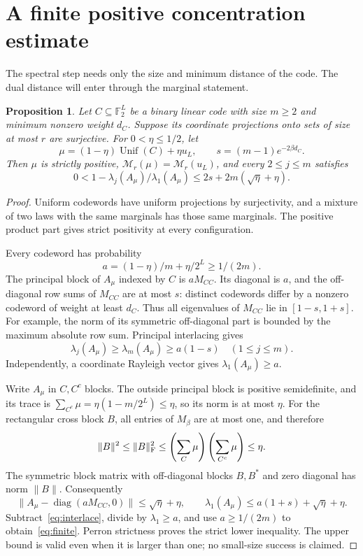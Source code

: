\documentclass[11pt]{article}
\newtheorem{proposition}[theorem]{Proposition}
\newcommand{\F}{\mathbb F}
\newcommand{\diag}{\operatorname{diag}}
\newcommand{\Unif}{\operatorname{Unif}}
\begin{document}
\section{A finite positive concentration estimate}
The spectral step needs only the size and minimum distance of the code.
The dual distance will enter through the marginal statement.

\begin{proposition}\label{prop:finite}
Let $C\subseteq\F_2^L$ be a binary linear code with size $m\ge2$ and
minimum nonzero weight $d_C$. Suppose its coordinate projections onto
sets of size at most $r$ are surjective. For $0<\eta\le1/2$, let
\begin{equation}\label{eq:mixture}
 \mu=(1-\eta)\Unif(C)+\eta u_L,
 \qquad s=(m-1)e^{-2\beta d_C}.
\end{equation}
Then $\mu$ is strictly positive, $\mathcal M_r(\mu)=\mathcal M_r(u_L)$,
and every $2\le j\le m$ satisfies
\begin{equation}\label{eq:finite}
 0<1-\lambda_j(A_\mu)/\lambda_1(A_\mu)
       \le 2s+2m(\sqrt\eta+\eta).
\end{equation}
\end{proposition}
\begin{proof}
Uniform codewords have uniform projections by surjectivity, and a mixture
of two laws with the same marginals has those same marginals. The positive
product part gives strict positivity at every configuration.

Every codeword has probability
\[
 a=(1-\eta)/m+\eta/2^L\ge1/(2m).
\]
The principal block of $A_\mu$ indexed by $C$ is $aM_{CC}$. Its diagonal
is $a$, and the off-diagonal row sums of $M_{CC}$ are at most $s$:
distinct codewords differ by a nonzero codeword of weight at least $d_C$.
Thus all eigenvalues of $M_{CC}$ lie in $[1-s,1+s]$. For example, the
norm of its symmetric off-diagonal part is bounded by the maximum
absolute row sum. Principal interlacing gives
\begin{equation}\label{eq:interlace}
 \lambda_j(A_\mu)\ge\lambda_m(A_\mu)\ge a(1-s)
       \quad(1\le j\le m).
\end{equation}
Independently, a coordinate Rayleigh vector gives $\lambda_1(A_\mu)\ge a$.

Write $A_\mu$ in $C,C^c$ blocks. The outside principal block is positive
semidefinite, and its trace is
$\sum_{C^c}\mu=\eta(1-m/2^L)\le\eta$, so its norm is at most $\eta$.
For the rectangular cross block $B$, all entries of $M_\beta$ are at most
one, and therefore
\[
 \|B\|^2\le\|B\|_{\rm F}^2
 \le\left(\sum_C\mu\right)\left(\sum_{C^c}\mu\right)\le\eta.
\]
The symmetric block matrix with off-diagonal blocks $B,B^*$ and zero
diagonal has norm $\|B\|$. Consequently
\[
 \bigl\|A_\mu-\diag(aM_{CC},0)\bigr\|\le\sqrt\eta+\eta,
 \qquad
 \lambda_1(A_\mu)\le a(1+s)+\sqrt\eta+\eta.
\]
Subtract~\eqref{eq:interlace}, divide by $\lambda_1\ge a$, and use
$a\ge1/(2m)$ to obtain~\eqref{eq:finite}. Perron strictness proves the
strict lower inequality. The upper bound is valid even when it is
larger than one; no small-size success is claimed.
\end{proof}
\end{document}
